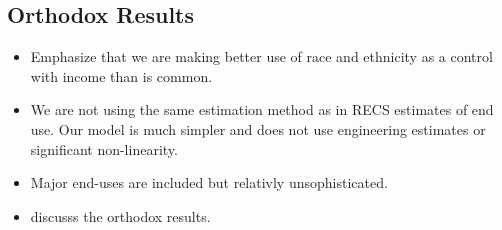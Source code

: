 \documentclass{article}
\begin{document}
  \subsection{Orthodox Results}
  
  \begin{itemize}
    \item Emphasize that we are making better use of race and ethnicity as a control with income than is common.
    \item We are not using the same estimation method as in RECS estimates of end use.  Our model is much simpler and does not use engineering estimates or significant non-linearity.
    \item Major end-uses are included but relativly unsophisticated.
    \item discusss the orthodox results.
  \end{itemize}
  
  
  
\end{document}
